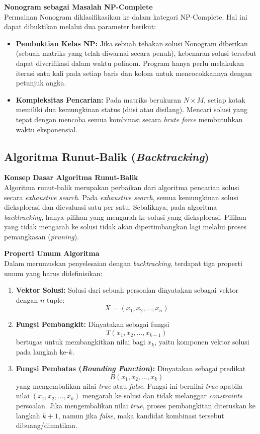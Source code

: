 \documentclass[conference]{IEEEtran}
\begin{document}
\textbf{Nonogram sebagai Masalah NP-Complete} \\
Permainan Nonogram diklasifikasikan ke dalam kategori NP-Complete. Hal ini dapat dibuktikan melalui dua parameter berikut:
\begin{itemize}
    \item \textbf{Pembuktian Kelas NP:} Jika sebuah tebakan solusi Nonogram diberikan (sebuah matriks yang telah diwarnai secara penuh), kebenaran solusi tersebut dapat diverifikasi dalam waktu polinom. Program hanya perlu melakukan iterasi satu kali pada setiap baris dan kolom untuk mencocokkannya dengan petunjuk angka.
    \item \textbf{Kompleksitas Pencarian:} Pada matriks berukuran $N \times M$, setiap kotak memiliki dua kemungkinan status (diisi atau disilang). Mencari solusi yang tepat dengan mencoba semua kombinasi secara \textit{brute force} membutuhkan waktu eksponensial. 
\end{itemize}

\subsection{Algoritma Runut-Balik (\textit{Backtracking})}

\textbf{Konsep Dasar Algoritma Runut-Balik} \\
Algoritma runut-balik merupakan perbaikan dari algoritma pencarian solusi secara \textit{exhaustive search}. Pada \textit{exhaustive search}, semua kemungkinan solusi dieksplorasi dan dievaluasi satu per satu. Sebaliknya, pada algoritma \textit{backtracking}, hanya pilihan yang mengarah ke solusi yang dieksplorasi. Pilihan yang tidak mengarah ke solusi tidak akan dipertimbangkan lagi melalui proses pemangkasan (\textit{pruning}).

\textbf{Properti Umum Algoritma} \\
Dalam merumuskan penyelesaian dengan \textit{backtracking}, terdapat tiga properti umum yang harus didefinisikan:
\begin{enumerate}
    \item \textbf{Vektor Solusi:} Solusi dari sebuah persoalan dinyatakan sebagai vektor dengan $n$-tuple: $$X = (x_1, x_2, ..., x_n)$$
    \item \textbf{Fungsi Pembangkit:} Dinyatakan sebagai fungsi $$T(x_1, x_2, ..., x_{k-1})$$ bertugas untuk membangkitkan nilai bagi $x_k$, yaitu komponen vektor solusi pada langkah ke-$k$.
    \item \textbf{Fungsi Pembatas (\textit{Bounding Function}):} Dinyatakan sebagai predikat $$B(x_1, x_2, ..., x_k)$$ yang mengembalikan nilai \textit{true} atau \textit{false}. Fungsi ini bernilai \textit{true} apabila nilai $(x_1, x_2, ..., x_k)$ mengarah ke solusi dan tidak melanggar \textit{constraints} persoalan. Jika mengembalikan nilai \textit{true}, proses pembangkitan diteruskan ke langkah $k+1$, namun jika \textit{false}, maka kandidat kombinasi tersebut dibuang/dimatikan.
\end{enumerate}
\end{document}
